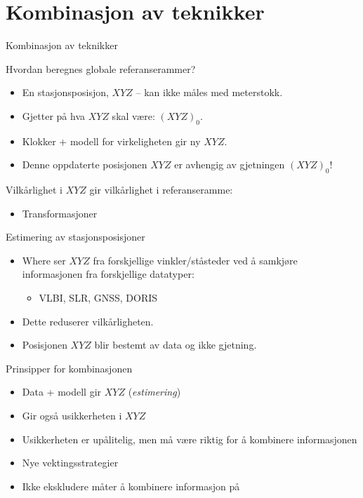 \documentclass[12pt,table,t]{beamer}
\begin{document}
\section{Kombinasjon av teknikker}

\begin{frame}[c]{}
  \begin{center}
    {\Huge Kombinasjon av teknikker}
  \end{center}
\end{frame}


\begin{frame}{Hvordan beregnes globale referanserammer?}

  \begin{itemize}
  \item En stasjonsposisjon, $XYZ$ -- kan ikke måles med meterstokk.
  \item Gjetter på hva $XYZ$ skal være: $(XYZ)_0$.
  \item Klokker + modell for virkeligheten gir ny $XYZ$.
  \item Denne oppdaterte posisjonen $XYZ$ er avhengig av gjetningen $(XYZ)_0$!
  \end{itemize}
  \pause

  Vilkårlighet i $XYZ$ gir vilkårlighet i referanseramme:
  \begin{itemize}
  \item Transformasjoner
  \end{itemize}
\end{frame}


\begin{frame}{Estimering av stasjonsposisjoner}

   \begin{itemize}
    \item Where ser $XYZ$ fra forskjellige vinkler/ståsteder ved å samkjøre informasjonen fra forskjellige datatyper:
      \begin{itemize}
      \item VLBI, SLR, GNSS, DORIS
      \end{itemize}
    \item Dette reduserer vilkårligheten.
    \item Posisjonen $XYZ$ blir bestemt av data og ikke gjetning.
   \end{itemize}
\end{frame}


\begin{frame}{Prinsipper for kombinasjonen}

  \begin{itemize}
   \item Data + modell gir $XYZ$ (\emph{estimering})
   \item Gir også usikkerheten i $XYZ$ 
   \item Usikkerheten er upålitelig, men må være riktig for å kombinere informasjonen
   \item Nye vektingsstrategier
   \item Ikke ekskludere måter å kombinere informasjon på
   \end{itemize}
\end{frame}
\end{document}
